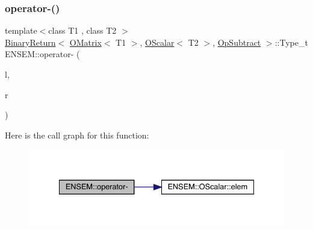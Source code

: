 \subsubsection{\texorpdfstring{operator-\/()}{operator-()}\hspace{0.1cm}{\footnotesize\ttfamily [3/4]}}
{\footnotesize\ttfamily template$<$class T1 , class T2 $>$ \\
\mbox{\hyperlink{structENSEM_1_1BinaryReturn}{Binary\+Return}}$<$ \mbox{\hyperlink{classENSEM_1_1OMatrix}{O\+Matrix}}$<$ T1 $>$, \mbox{\hyperlink{classENSEM_1_1OScalar}{O\+Scalar}}$<$ T2 $>$, \mbox{\hyperlink{structENSEM_1_1OpSubtract}{Op\+Subtract}} $>$\+::Type\+\_\+t E\+N\+S\+E\+M\+::operator-\/ (\begin{DoxyParamCaption}\item[{const \mbox{\hyperlink{classENSEM_1_1OMatrix}{O\+Matrix}}$<$ T1 $>$ \&}]{l,  }\item[{const \mbox{\hyperlink{classENSEM_1_1OScalar}{O\+Scalar}}$<$ T2 $>$ \&}]{r }\end{DoxyParamCaption})\hspace{0.3cm}{\ttfamily [inline]}}

Here is the call graph for this function\+:\nopagebreak
\begin{figure}[H]
\begin{center}
\leavevmode
\includegraphics[width=334pt]{d8/d55/group__obsmatrix_ga14c923aa4a21485e30dc3ed6f5c0ab46_cgraph}
\end{center}
\end{figure}
\mbox{\label{group__obsmatrix_ga57164fdcdeca01384e08724c0cf01504}} 
